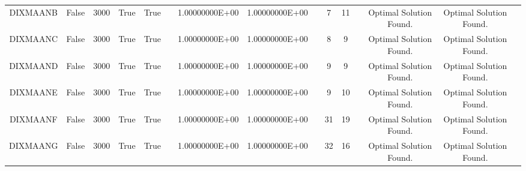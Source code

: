 \begin{longtable}{ccccccccccccccc}
	\cellcolor{default2} DIXMAANB& \cellcolor{default2} False& \cellcolor{default2} 3000& \cellcolor{default2} True& \cellcolor{default2} True& \cellcolor{header} & \cellcolor{best} 1.00000000E+00& \cellcolor{best} 1.00000000E+00& \cellcolor{header} & \cellcolor{best} 7& \cellcolor{ok} 11& \cellcolor{header} & \cellcolor{default2} Optimal Solution Found.& \cellcolor{default2} Optimal Solution Found.& \cellcolor{header} \\
	\cellcolor{default1} DIXMAANC& \cellcolor{default1} False& \cellcolor{default1} 3000& \cellcolor{default1} True& \cellcolor{default1} True& \cellcolor{header} & \cellcolor{best} 1.00000000E+00& \cellcolor{best} 1.00000000E+00& \cellcolor{header} & \cellcolor{best} 8& \cellcolor{ok} 9& \cellcolor{header} & \cellcolor{default1} Optimal Solution Found.& \cellcolor{default1} Optimal Solution Found.& \cellcolor{header} \\
	\cellcolor{default2} DIXMAAND& \cellcolor{default2} False& \cellcolor{default2} 3000& \cellcolor{default2} True& \cellcolor{default2} True& \cellcolor{header} & \cellcolor{best} 1.00000000E+00& \cellcolor{best} 1.00000000E+00& \cellcolor{header} & \cellcolor{best} 9& \cellcolor{best} 9& \cellcolor{header} & \cellcolor{default2} Optimal Solution Found.& \cellcolor{default2} Optimal Solution Found.& \cellcolor{header} \\
	\cellcolor{default1} DIXMAANE& \cellcolor{default1} False& \cellcolor{default1} 3000& \cellcolor{default1} True& \cellcolor{default1} True& \cellcolor{header} & \cellcolor{best} 1.00000000E+00& \cellcolor{best} 1.00000000E+00& \cellcolor{header} & \cellcolor{best} 9& \cellcolor{ok} 10& \cellcolor{header} & \cellcolor{default1} Optimal Solution Found.& \cellcolor{default1} Optimal Solution Found.& \cellcolor{header} \\
	\cellcolor{default2} DIXMAANF& \cellcolor{default2} False& \cellcolor{default2} 3000& \cellcolor{default2} True& \cellcolor{default2} True& \cellcolor{header} & \cellcolor{best} 1.00000000E+00& \cellcolor{best} 1.00000000E+00& \cellcolor{header} & \cellcolor{ok} 31& \cellcolor{best} 19& \cellcolor{header} & \cellcolor{default2} Optimal Solution Found.& \cellcolor{default2} Optimal Solution Found.& \cellcolor{header} \\
	\cellcolor{default1} DIXMAANG& \cellcolor{default1} False& \cellcolor{default1} 3000& \cellcolor{default1} True& \cellcolor{default1} True& \cellcolor{header} & \cellcolor{best} 1.00000000E+00& \cellcolor{best} 1.00000000E+00& \cellcolor{header} & \cellcolor{ok} 32& \cellcolor{best} 16& \cellcolor{header} & \cellcolor{default1} Optimal Solution Found.& \cellcolor{default1} Optimal Solution Found.& \cellcolor{header} \\

\end{longtable}
